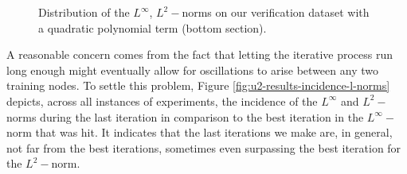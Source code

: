 \documentclass[12pt]{report} %
\begin{document}
\begin{figure}
\begin{tabular}{cccccc}
  \end{tabular}
  \caption{Distribution of the $L^\infty$, $L^2-$norms on our verification dataset
    with a quadratic polynomial term (bottom section).}
  \label{fig:u2-results-overall-poly2}
\end{figure}

A reasonable concern comes from the fact that letting the iterative process run long enough might eventually allow for oscillations to arise between any two training nodes. To settle this problem, Figure \ref{fig:u2-results-incidence-l-norms} depicts, across all instances of experiments, the incidence of the $L^\infty$ and $L^2-$norms during the last iteration in comparison to the best iteration in the $L^\infty-$norm that was hit. It indicates that the last iterations we make are, in general, not far from the best iterations, sometimes even surpassing the best iteration for the $L^2-$norm.
\end{document}
